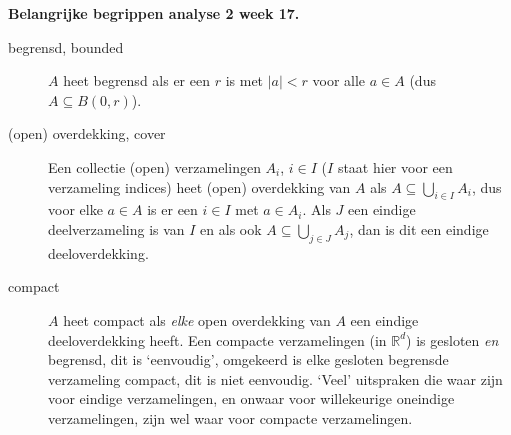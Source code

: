 {\bf Belangrijke begrippen analyse 2 week 17.}
\vskip 8pt
\begin{description}
\item[begrensd, bounded] $A$ heet begrensd als er een $r$ is met $|a|<r$ voor alle
$a\in A$ (dus $A\subseteq B(0,r)$).
\item[(open) overdekking, cover] Een collectie (open) verzamelingen $A_i$, $i\in I$ ($I$ staat 
hier voor een verzameling indices) heet (open) overdekking van $A$ als $A\subseteq \bigcup_{i\in I} A_i$,
dus voor elke $a\in A$ is er een $i\in I$ met $a\in A_i$. Als $J$ een eindige deelverzameling is van
$I$ en als ook $A\subseteq \bigcup_{j\in J} A_j$, dan is dit een eindige deeloverdekking. 
\item[compact] $A$ heet compact als {\em elke} open overdekking van $A$ een eindige deeloverdekking
heeft. Een compacte verzamelingen (in $\mathbb R^d$) is gesloten {\em en} begrensd, dit is `eenvoudig',
omgekeerd is elke gesloten begrensde verzameling compact, dit is niet eenvoudig. `Veel' uitspraken die
waar zijn voor eindige verzamelingen, en onwaar voor willekeurige oneindige verzamelingen, zijn wel waar
voor compacte verzamelingen. 
\end{description}